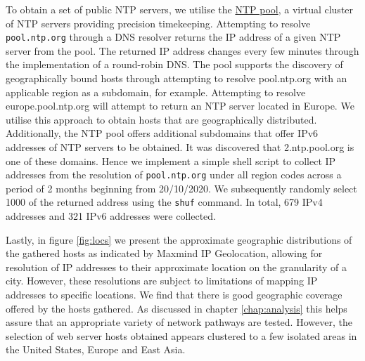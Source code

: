 \documentclass{l4proj}
\begin{document}
To obtain a set of public NTP servers, we utilise the \href{https://www.pool.ntp.org}{NTP pool}, a virtual cluster of NTP servers providing precision timekeeping. Attempting to resolve \lstinline{pool.ntp.org} through a DNS resolver returns the IP address of a given NTP server from the pool. The returned IP address changes every few minutes through the implementation of a round-robin DNS. The pool supports the discovery of geographically bound hosts through attempting to resolve pool.ntp.org with an applicable region as a subdomain, for example. Attempting to resolve europe.pool.ntp.org will attempt to return an NTP server located in Europe. We utilise this approach to obtain hosts that are geographically distributed. Additionally, the NTP pool offers additional subdomains that offer IPv6 addresses of NTP servers to be obtained. It was discovered that 2.ntp.pool.org is one of these domains.
Hence we implement a simple shell script to collect IP addresses from the resolution of \lstinline{pool.ntp.org} under all region codes across a period of 2 months beginning from 20/10/2020. We subsequently randomly select 1000 of the returned address using the \lstinline{shuf} command. In total, 679 IPv4 addresses and 321 IPv6 addresses were collected.

Lastly, in figure \ref{fig:locs} we present the approximate geographic distributions of the gathered hosts as indicated by Maxmind IP Geolocation, allowing for resolution of IP addresses to their approximate location on the granularity of a city. However, these resolutions are subject to limitations of mapping IP addresses to specific locations\cite{shavitt_geolocation_2011}. We find that there is good geographic coverage offered by the hosts gathered. As discussed in chapter \ref{chap:analysis} this helps assure that an appropriate variety of network pathways are tested. However, the selection of web server hosts obtained appears clustered to a few isolated areas in the United States, Europe and East Asia.
\end{document}
